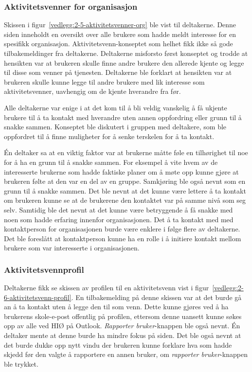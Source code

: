 \subsubsection{Aktivitetsvenner for organisasjon}

Skissen i figur~\ref{vedlegg:2-5-aktivitetsvenner-org} ble vist til deltakerne. Denne siden inneholdt en oversikt over alle brukere som hadde meldt interesse for en spesifikk organisasjon. Aktivitetsvenn-konseptet som helhet fikk ikke så gode tilbakemeldinger fra deltakerne. Deltakerne misforsto først konseptet og trodde at hensikten var at brukeren skulle finne andre brukere den allerede kjente og legge til disse som venner på tjenesten. Deltakerne ble forklart at hensikten var at brukeren skulle kunne legge til andre brukere med lik interesse som aktivitetsvenner, uavhengig om de kjente hverandre fra før. 

Alle deltakerne var enige i at det kom til å bli veldig vanskelig å få ukjente brukere til å ta kontakt med hverandre uten annen oppfordring eller grunn til å snakke sammen. Konseptet ble diskutert i gruppen med deltakere, som ble oppfordret til å finne muligheter for å senke terskelen for å ta kontakt. 

Én deltaker sa at en viktig faktor var at brukerne måtte føle en tilhørighet til noe for å ha en grunn til å snakke sammen. For eksempel å vite hvem av de interesserte brukerne som hadde faktiske planer om å møte opp kunne gjøre at brukeren følte at den var en del av en gruppe. Samkjøring ble også nevnt som en grunn til å snakke sammen. Det ble nevnt at det kunne være lettere å ta kontakt om brukeren kunne se at de brukerene den kontaktet var på samme nivå som seg selv. Samtidig ble det nevnt at det kunne være betryggende å få snakke med noen som hadde erfaring innenfor organisasjonen. Det å ta kontakt med med kontaktperson for organisasjonen burde være enklere i følge flere av deltakerne. Det ble foreslått at kontaktperson kunne ha en rolle i å initiere kontakt mellom brukere som var interesserte i organisasjonen.


\subsubsection{Aktivitetsvennprofil}

Deltakerne fikk se skissen av profilen til en aktivitetsvenn vist i figur~\ref{vedlegg:2-6-aktivitetsvenn-profil}. En tilbakemelding på denne skissen var at det burde gå an å ta kontakt uten å legge den til som venn. Dette kunne gjøres ved å ha brukerens skole-e-post offentlig på profilen, ettersom denne uansett kunne søkes opp av alle ved HIØ på Outlook. {\em  Rapporter bruker}-knappen ble også nevnt. Én deltaker mente at denne burde ha mindre fokus på siden. Det ble også nevnt at det burde dukke opp nytt vindu der brukeren kunne forklare hva som hadde skjedd før den valgte å rapportere en annen bruker, om {\em  rapporter bruker}-knappen ble trykket.


